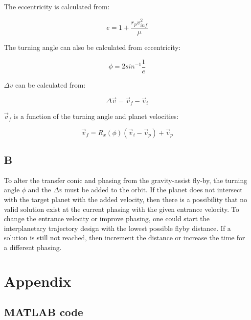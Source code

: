 \documentclass[conf]{new-aiaa}
\begin{document}
The eccentricity is calculated from: 

\begin{equation}
    e = 1 + \frac{r_p v_{inf}^2}{\mu}
\end{equation}

The turning angle can also be calculated from eccentricity: 

\begin{equation}
    \phi = 2 sin^{-1} \frac{1}{e}
\end{equation}

$\Delta v$ can be calculated from: 

\begin{equation}
    \Delta \overrightarrow{v} = \overrightarrow{v}_f - \overrightarrow{v}_i
\end{equation}

$\overrightarrow{v}_f$ is a function of the turning angle and planet velocities: 

\begin{equation}
    \overrightarrow{v}_f = R_x(\phi) ( \overrightarrow{v}_i - \overrightarrow{v}_p ) + \overrightarrow{v}_p
\end{equation}

\subsection*{B}

To alter the transfer conic and phasing from the gravity-assist fly-by, the turning angle $\phi$ and the $\Delta v$ must be added to the orbit. If the planet does not intersect with the target planet with the  added velocity, then there is a possibility that no valid solution exist at the current phasing with the given entrance velocity. To change the entrance velocity or improve phasing, one could start the interplanetary trajectory design with the lowest possible flyby distance. If a solution is still not reached, then increment the distance or increase the time for a different phasing. 

\section*{Appendix} 

\subsection*{MATLAB code} 
\end{document}
